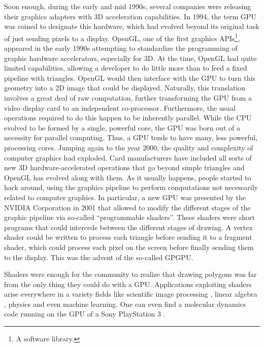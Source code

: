 \documentclass[ twoside,openright,titlepage,numbers=noenddot,%
headinclude,footinclude,cleardoublepage=empty,abstract=on,
BCOR=5mm,paper=a4,fontsize=11pt, dvipsnames
]{scrreprt}
\newcommand{\gpu}{\gls{GPU}\xspace}
\begin{document}
Soon enough, during the early and mid 1990s, several companies were releasing their graphics adapters with 3D acceleration capabilities. In 1994, the term \gpu was coined to designate this hardware, which had evolved beyond its original task of just sending pixels to a display.
OpenGL\cite{opengl}, one of the first graphics \glspl{API}\footnote{A software library.}, appeared in the early 1990s attempting to standardize the programming of graphic hardware accelerators, especially for 3D.
At the time, OpenGL had quite limited capabilities, allowing a developer to do little more than to feed a fixed pipeline with triangles. OpenGL would then interface with the \gpu to turn this geometry into a 2D image that could be displayed.
Naturally, this translation involves a great deal of raw computation, further transforming the \gpu from a video display card to an independent co-processor. Furthermore,  the usual operations required to do this happen to be inherently parallel. While the CPU evolved to be formed by a single, powerful core, the \gpu was born out of a necessity for parallel computing. Thus, a \gpu tends to have many, less powerful, processing cores.
Jumping again to the year 2000, the quality and complexity of computer graphics had exploded. Card manufacturers have included all sorts of new 3D hardware-accelerated operations that go beyond simple triangles and OpenGL has evolved along with them. As it usually happens, people started to hack around, using the graphics pipeline to perform computations not necessarily related to computer graphics. In particular, a new \gpu was presented by the NVIDIA Corporation in 2001 that allowed to modify the different stages of the graphic pipeline via so-called ``programmable shaders''. These shaders were short programs that could intercede between the different stages of drawing. A vertex shader could be written to process each triangle before sending it to a fragment shader, which could process each pixel on the screen before finally sending them to the display. This was the advent of the so-called \gls{GPGPU}.

Shaders were enough for the community to realize that drawing polygons was far from the only thing they could do with a \gpu\cite{gpgpu2002}. Applications exploiting shaders arise everywhere in a variety fields like scientific image processing \cite{gpuimage2003, gpuimage2006}, linear algebra \cite{gpulinalg2001, gpulinalg2003a, gpulinalg2003b}, physics \cite{gpulbm2004} and even machine learning\cite{gpuml2005, gpuml1998}. One can even find a molecular dynamics code running on the \gpu of a Sony PlayStation 3 \cite{ps3md2009}.
\end{document}
